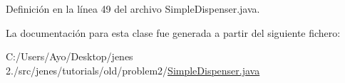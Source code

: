 Definición en la línea 49 del archivo Simple\-Dispenser.\-java.



La documentación para esta clase fue generada a partir del siguiente fichero\-:\begin{DoxyCompactItemize}
\item 
C\-:/\-Users/\-Ayo/\-Desktop/jenes 2./src/jenes/tutorials/old/problem2/\hyperlink{old_2problem2_2_simple_dispenser_8java}{Simple\-Dispenser.\-java}\end{DoxyCompactItemize}
